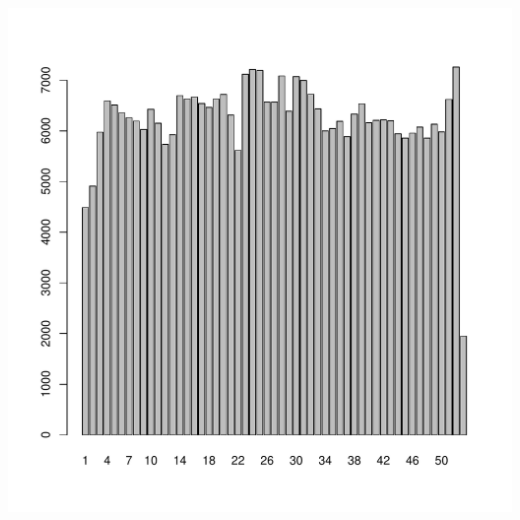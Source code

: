 \documentclass[12pt,english,french,twoside]{report}\usepackage[]{graphicx}\usepackage[]{color}
\makeatletter
\def\maxwidth{ %
  \ifdim\Gin@nat@width>\linewidth
    \linewidth
  \else
    \Gin@nat@width
  \fi
}
\makeatother
\begin{document}
\includegraphics[width=\maxwidth]{figure/act_sem} 
\end{document}
